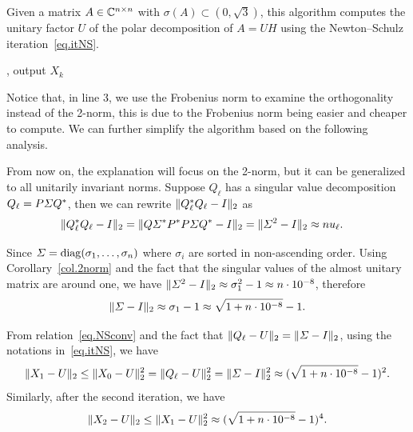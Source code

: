 \begin{algorithm}[ht]
\caption{Given a matrix $A\in\mathbb{C}^{n\times n}$ with $\sigma(A)\subset (0,\sqrt{3})$, this algorithm computes the unitary factor $U$ of the polar decomposition of $A = UH$ using the Newton--Schulz iteration~\eqref{eq.itNS}.}
\label{alg:NSiter}
\begin{algorithmic}[1]
            , output $X_k$
        \EndIf
    \EndFor
\end{algorithmic}
\end{algorithm}

Notice that, in line 3, we use the Frobenius norm to examine the orthogonality instead of the 2-norm, this is due to the Frobenius norm being easier and cheaper to compute. We can further simplify the algorithm based on the following analysis.

From now on, the explanation will focus on the 2-norm, but it can be generalized to all unitarily invariant norms. Suppose $Q_\ell$ has a singular value decomposition $Q_\ell = P\varSigma Q^*$, then we can rewrite $\|{Q_\ell^* Q_\ell - I}\|_2$ as 
\begin{equation}\notag
    \begin{aligned}
        \|{Q_\ell^* Q_\ell - I}\|_2 & = \|{Q\varSigma^* P^* P\varSigma Q^* -I}\|_2 = \|{\varSigma^2 - I}\|_2 \approx nu_\ell.
    \end{aligned}
\end{equation}

Since $\varSigma = \mathrm{diag}(\sigma_1,\dots,\sigma_n)$ where $\sigma_i$ are sorted in non-ascending order. Using Corollary~\ref{col.2norm} and the fact that the singular values of the almost unitary matrix are around one, we have $\|{\varSigma^2 - I}\|_2 \approx {\sigma_1^2 - 1} \approx n \cdot 10^{-8}$, therefore 
\begin{equation}\notag
  \|{\varSigma - I}\|_2 \approx \sigma_1 - 1 \approx \sqrt{1 + n\cdot 10^{-8}} - 1.
\end{equation} 

From relation~\eqref{eq.NSconv} and the fact that $\|{Q_\ell - U}\|_2 = \|{\varSigma - I}\|_2$, using the notations in~\eqref{eq.itNS}, we have 
\begin{equation}\notag
  \|{X_1 - U}\|_2 \leq \|{X_0 - U}\|_2^2 = \|{Q_\ell -U}\|_2^2 = \|{\varSigma - I}\|_2^2 \approx (\sqrt{1+n\cdot 10^{-8}} - 1)^2.
\end{equation}
Similarly, after the second iteration, we have 
\begin{equation}\notag
  \|{X_2 - U}\|_2 \leq \|{X_1 - U}\|_2^2 \approx (\sqrt{1+n\cdot 10^{-8}} - 1)^4.
\end{equation}

